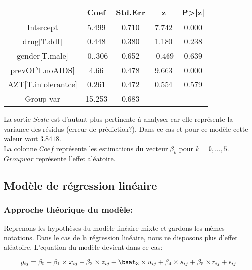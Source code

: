 \documentclass{article}
\begin{document}
\begin{center}
    \begin{tabular}{|c|c|c|c|c|}
    \hline
         & Coef & Std.Err & z & P>|z|   \\
         \hline \hline
        Intercept & 5.499 & 0.710 & 7.742 & 0.000\\
         drug[T.ddI] & 0.448 & 0.380 & 1.180 & 0.238 \\
         gender[T.male] & -0..306 & 0.652 & -0.469 & 0.639\\
         prevOI[T.noAIDS] & 4.66 & 0.478 & 9.663 & 0.000\\
         AZT[T.intolerantce]  & 0.261 & 0.472 & 0.554 & 0.579\\
         Group var &  15.253 & 0.683 &  & \\
         \hline
    \end{tabular}
\end{center}

La sortie $Scale$ est d'autant plus pertinente à analyser car elle représente la variance des résidus (erreur de prédiction?). Dans ce cas et pour ce modèle cette valeur vaut $3.8418$.\\
La colonne $Coef$ représente les estimations du vecteur $\beta_k$ pour $k=0,...,5$.\\
$Group var$ représente l'effet aléatoire.

\subsection{Modèle de régression linéaire}

\subsubsection{Approche théorique du modèle:}


Reprenons les hypothèses du modèle linéaire mixte et gardons les mêmes notations. Dans le cas de la régression linéaire, nous ne disposons plus d'effet aléatoire. L'équation du modèle devient dans ce cas:

\[y_{ij} = \beta_0 + \beta_1 \times x_{ij} + \beta_2 \times z_{ij} +\beat_3 \times u_{ij} + \beta_4 \times s_{ij} + \beta_5 \times r_{ij} + \epsilon_{ij}\]
\end{document}
